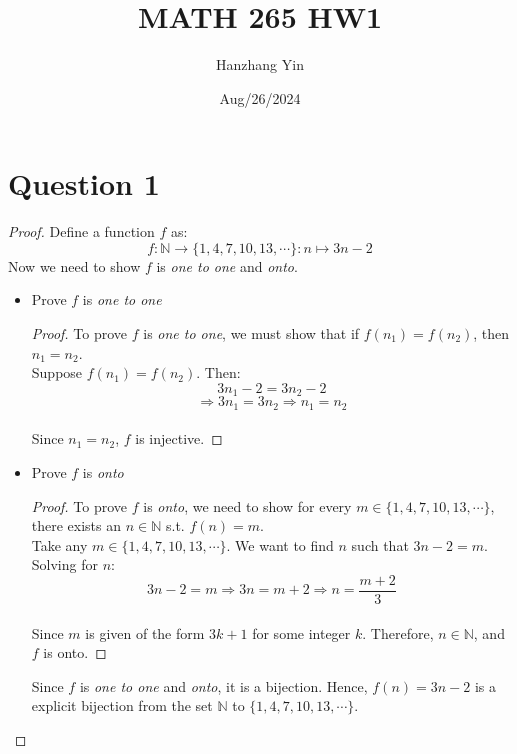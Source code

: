 \documentclass{article}
\title{MATH 265 HW1}
\author{Hanzhang Yin}
\date{Aug/26/2024}
\begin{document}
\maketitle

\section*{Question 1}
\begin{proof}
    Define a function $f$ as:
    \[ f: \mathbb{N} \rightarrow \{1,4,7,10,13,\cdots\}: n \mapsto 3n-2 \]
    Now we need to show $f$ is \textit{one to one} and \textit{onto}.
    \begin{itemize}
        \item Prove $f$ is \textit{one to one}
        \begin{proof}
            To prove $f$ is \textit{one to one}, we must show that if $f(n_1) = f(n_2)$, then $n_1 = n_2$.
            \\
            Suppose $f(n_1) = f(n_2)$. Then:
            \[ 3n_1 - 2 = 3n_2 - 2 \]
            \[ \Rightarrow 3n_1 = 3n_2 \Rightarrow n_1 = n_2\]
            \\
            Since $n_1 = n_2$, $f$ is injective.
        \end{proof}
        \item Prove $f$ is \textit{onto}
        \begin{proof}
            To prove $f$ is \textit{onto}, we need to show for every $m \in \{1,4,7,10,13,\cdots\}$, there exists an $n \in \mathbb{N}$ s.t. $f(n) = m$.
            \\
            Take any $m \in \{1,4,7,10,13,\cdots\}$. We want to find $n$ such that $3n-2 = m$. Solving for $n$:
            \[ 3n-2 = m \Rightarrow 3n = m + 2 \Rightarrow n = \frac{m+2}{3} \]
            \\
            Since $m$ is given of the form $3k+1$ for some integer $k$. Therefore, $n \in \mathbb{N}$, and $f$ is onto.
        \end{proof}
        Since $f$ is \textit{one to one} and \textit{onto}, it is a bijection. Hence, $f(n) = 3n - 2$ is a explicit bijection from the set $\mathbb{N}$ to $\{1,4,7,10,13,\cdots\}$.
    \end{itemize}
\end{proof}
\end{document}
